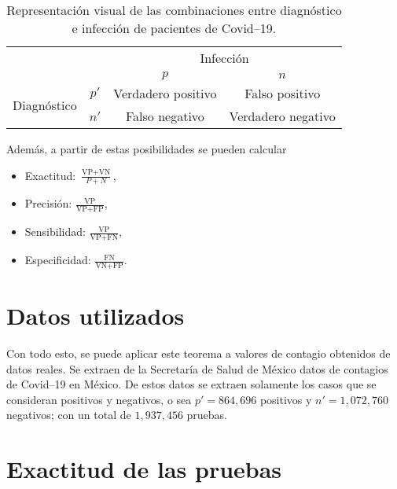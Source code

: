 \documentclass[paper=leter, fontsize=11pt]{scrartcl}
\numberwithin{equation}{section}		%
\numberwithin{figure}{section}			%
\numberwithin{table}{section}				%
\begin{document}
\begin{table}[]
    \centering
    \caption{Representación visual de las combinaciones entre diagnóstico e infección de pacientes de Covid--19.}
    \begin{tabular}{cc|c|c|}
    \cline{3-4}
                                                       &      & \multicolumn{2}{c|}{Infección} \\ \cline{3-4} 
                                                       &      & $p$               & $n$        \\ \hline
    \multicolumn{1}{|c|}{\multirow{2}{*}{Diagnóstico}} & $p'$ & Verdadero positivo         & Falso positivo         \\ \cline{2-4} 
    \multicolumn{1}{|c|}{}                             & $n'$ & Falso negativo                & Verdadero negativo         \\ \hline
    \end{tabular}
    \label{posibilidades}
\end{table}

Además, a partir de estas posibilidades se pueden calcular
\begin{itemize}
    \item Exactitud: $\frac{\text{VP} + \text{VN}}{P + N}$,
    \item Precisión: $\frac{\text{VP}}{\text{VP} + \text{FP}}$,
    \item Sensibilidad: $\frac{\text{VP}}{\text{VP} + \text{FN}}$,
    \item Especificidad: $\frac{\text{FN}}{\text{VN} + \text{FP}}$.
\end{itemize}

\section{Datos utilizados}

Con todo esto, se puede aplicar este teorema a valores de contagio obtenidos de datos reales. Se extraen de la Secretaría de Salud de México \citep{gob} datos de contagios de Covid--19 en México. De estos datos se extraen solamente los casos que se consideran positivos y negativos, o sea $p' = 864,696$ positivos y $n' = 1,072,760$ negativos; con un total de $1,937,456$ pruebas.

\section{Exactitud de las pruebas}
\end{document}
